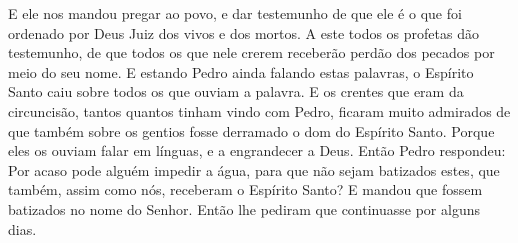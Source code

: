 {E ele nos mandou pregar ao povo, e dar testemunho de que ele é o que foi ordenado por Deus
{} Juiz dos vivos e dos mortos.
A este todos os profetas dão testemunho, de que todos os que nele crerem receberão perdão dos pecados por meio do seu nome.
E estando Pedro ainda falando estas palavras, o Espírito Santo caiu sobre todos os que ouviam a palavra.
E os crentes que eram da circuncisão, tantos quantos tinham vindo com Pedro, ficaram muito admirados de que também sobre os gentios fosse derramado o dom do Espírito Santo.
Porque eles os ouviam falar em
{} línguas, e a engrandecer a Deus. Então Pedro respondeu:
Por acaso pode alguém impedir a água, para que não sejam batizados estes, que também, assim como nós, receberam o Espírito Santo?
E mandou que fossem batizados no nome do Senhor. Então lhe pediram que continuasse
{} por alguns dias.

}
